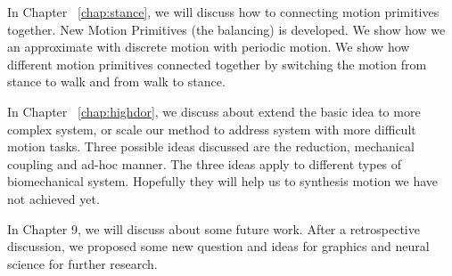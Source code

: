 In Chapter ~\ref{chap:stance}, we will discuss how to connecting motion primitives together.
New Motion Primitives (the balancing) is developed. We show how we an approximate with discrete motion with periodic motion. We show how different motion primitives connected together by switching the motion from stance to walk and from walk to stance.

In Chapter ~\ref{chap:highdor}, we discuss about extend the basic idea to more complex system, or scale our method to address system with more difficult motion tasks. Three possible ideas discussed are the reduction, mechanical coupling and ad-hoc manner. The three ideas apply to different types of biomechanical system.
Hopefully they will help us to synthesis motion we have not achieved yet.

In Chapter 9, we will discuss about some future work. After a retrospective discussion, we proposed some new question and ideas for graphics and neural science for further research.







